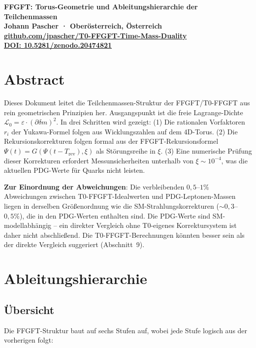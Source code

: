 {\centering
\Large\bfseries\color{T0blue}
FFGFT: Torus-Geometrie und Ableitungshierarchie der Teilchenmassen\\[0.4em]
\normalsize\color{T0gray}
Johann Pascher · Oberösterreich, Österreich\\
\href{https://github.com/jpascher/T0-FFGFT-Time-Mass-Duality}{github.com/jpascher/T0-FFGFT-Time-Mass-Duality}\\
\href{https://zenodo.org/records/20474821}{DOI: 10.5281/zenodo.20474821}\\[0.8em]
}
\thispagestyle{firstpage}



\section*{Abstract}
Dieses Dokument leitet die Teilchenmassen-Struktur der FFGFT/T0-FFGFT
aus rein geometrischen Prinzipien her. Ausgangspunkt ist die freie
Lagrange-Dichte $\mathcal{L}_0 = \varepsilon \cdot (\partial\delta m)^2$.
In drei Schritten wird gezeigt: (1) Die rationalen Vorfaktoren $r_i$ der
Yukawa-Formel folgen aus Wicklungszahlen auf dem 4D-Torus. (2) Die
Rekursionskorrekturen folgen formal aus der FFGFT-Rekursionsformel
$\Psi(t) = G(\Psi(t-T_{\mathrm{rev}}), \xi)$ als Störungsreihe in $\xi$.
(3) Eine numerische Prüfung dieser Korrekturen erfordert Messunsicherheiten
unterhalb von $\xi \sim 10^{-4}$, was die aktuellen PDG-Werte für Quarks
nicht leisten.

\textbf{Zur Einordnung der Abweichungen}: Die verbleibenden $0{,}5$--$1\%$
Abweichungen zwischen T0-FFGFT-Idealwerten und PDG-Leptonen-Massen
liegen in derselben Größenordnung wie die SM-Strahlungskorrekturen
($\sim 0{,}3$--$0{,}5\%$), die in den PDG-Werten enthalten sind.
Die PDG-Werte sind SM-modellabhängig -- ein direkter Vergleich ohne
T0-eigenes Korrektursystem ist daher nicht abschließend. Die
T0-FFGFT-Berechnungen könnten besser sein als der direkte Vergleich
suggeriert (Abschnitt~9).

\tableofcontents
\newpage

\section{Ableitungshierarchie}

\subsection{Übersicht}

Die FFGFT-Struktur baut auf sechs Stufen auf, wobei jede Stufe logisch
aus der vorherigen folgt:

